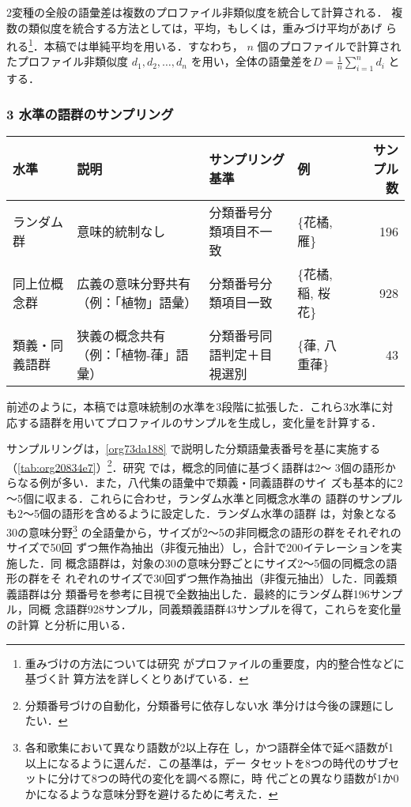 \documentclass[submit]{ipsj}
\renewcommand{\ref}{\cref}
\begin{document}
2変種の全般の語彙差は複数のプロファイル非類似度を統合して計算される．
複数の類似度を統合する方法としては，平均，もしくは，重みづけ平均があげ
られる\footnote{重みづけの方法については研究 \cite{Ruette2014Semantic} がプロファイルの重要度，内的整合性などに基づく計
算方法を詳しくとりあげている．}．本稿では単純平均を用いる．すなわち，
\(n\) 個のプロファイルで計算されたプロファイル非類似度 \(d_1, d_2,
\ldots, d_n\) を用い，全体の語彙差を\(D=\frac{1}{n} \sum_{i=1}^{n}
d_i\) とする．
\subsubsection{3 水準の語群のサンプリング\label{orgca0166a}}
\label{sec:orga44b6f4}
\begin{table*}[t]
\caption{\label{tab:org20834e7}3水準の語形集合のサンプル例}
\centering
\begin{tabular}{llllr}
水準 & 説明 & サンプリング基準 & 例 & サンプル数\\
\hline
ランダム群 & 意味的統制なし & 分類番号分類項目不一致 & \{花橘, 雁\} & 196\\
同上位概念群 & 広義の意味分野共有（例：「植物」語彙） & 分類番号分類項目一致 & \{花橘, 稲, 桜花\} & 928\\
類義・同義語群 & 狭義の概念共有（例：「植物-葎」語彙） & 分類番号同語判定＋目視選別 & \{葎, 八重葎\} & 43\\
\end{tabular}
\end{table*}

前述のように，本稿では意味統制の水準を3段階に拡張した．これら3水準に対
応する語群を用いてプロファイルのサンプルを生成し，変化量を計算する．

サンプルリングは，\ref{org73da188} で説明した分類語彙表番号を基に実施する
（\ref{tab:org20834e7}）\footnote{分類番号づけの自動化，分類番号に依存しない水
準分けは今後の課題にしたい．}．研究
\cite{Speelman2003Profilebased} では，概念的同値に基づく語群は2～
3個の語形からなる例が多い．また，八代集の語彙中で類義・同義語群のサイ
ズも基本的に2～5個に収まる．これらに合わせ，ランダム水準と同概念水準の
語群のサンプルも2～5個の語形を含めるように設定した．ランダム水準の語群
は，対象となる30の意味分野\footnote{各和歌集において異なり語数が2以上存在
し，かつ語群全体で延べ語数が1以上になるように選んだ．この基準は，デー
タセットを8つの時代のサブセットに分けて8つの時代の変化を調べる際に，時
代ごとの異なり語数が1か0かになるような意味分野を避けるために考えた．}
の全語彙から，サイズが2～5の非同概念の語形の群をそれぞれのサイズで50回
ずつ無作為抽出（非復元抽出）し，合計で200イテレーションを実施した．同
概念語群は，対象の30の意味分野ごとにサイズ2～5個の同概念の語形の群をそ
れぞれのサイズで30回ずつ無作為抽出（非復元抽出）した．同義類義語群は分
類番号を参考に目視で全数抽出した．最終的にランダム群196サンプル，同概
念語群928サンプル，同義類義語群43サンプルを得て，これらを変化量の計算
と分析に用いる．
\end{document}
